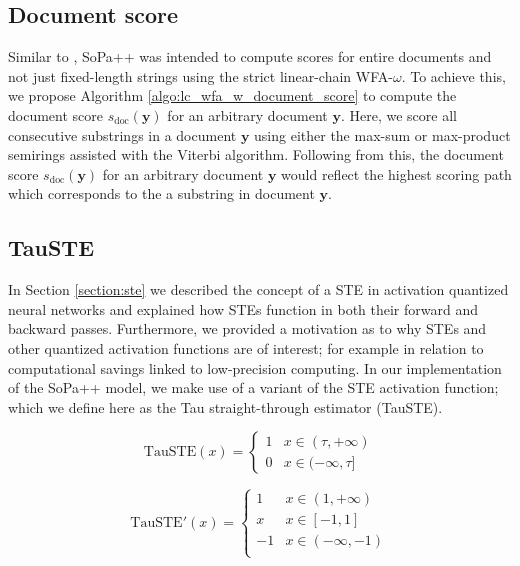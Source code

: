 \subsection{Document score}

Similar to \citet{schwartz2018sopa}, SoPa++ was intended to compute scores for
entire documents and not just fixed-length strings using the strict linear-chain
WFA-$\omega$. To achieve this, we propose Algorithm
\ref{algo:lc_wfa_w_document_score} to compute the document score
$s_{\text{doc}}(\bm{y})$ for an arbitrary document $\bm{y}$. Here, we score all
consecutive substrings in a document $\bm{y}$ using either the max-sum or
max-product semirings assisted with the Viterbi algorithm. Following from this,
the document score $s_{\text{doc}}(\bm{y})$ for an arbitrary document $\bm{y}$
would reflect the highest scoring path which corresponds to the a substring in
document $\bm{y}$.

\subsection{TauSTE}

In Section \ref{section:ste} we described the concept of a STE in activation
quantized neural networks and explained how STEs function in both their forward
and backward passes. Furthermore, we provided a motivation as to why STEs and
other quantized activation functions are of interest; for example in relation to
computational savings linked to low-precision computing. In our implementation
of the SoPa++ model, we make use of a variant of the STE activation function;
which we define here as the Tau straight-through estimator (TauSTE).

\begin{equation}
  \label{eq:tau_ste_forward}
  \text{TauSTE}(x)=
  \begin{cases}
    1 & x \in (\tau, +\infty) \\
    0 & x \in (-\infty, \tau]
  \end{cases}
\end{equation}

\begin{equation}
  \label{eq:tau_ste_backward}
  \text{TauSTE}'(x)=
  \begin{cases}
    1 & x \in  (1, +\infty) \\
    x & x \in [-1, 1] \\
    -1 & x \in (-\infty, -1) \\
  \end{cases}
\end{equation}

